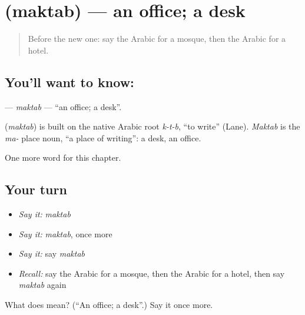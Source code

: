 \section[\texorpdfstring{\ar{مكتب} (maktab)}{مكتب (maktab)}]{ (maktab) — an office; a desk}

\label{lesson:AR-C92-maktab}



\begin{quote}
Before the new one: say the Arabic for a mosque, then the Arabic for a hotel.
\end{quote}

\subsection*{You'll want to know: }
\textbf{} — \emph{maktab} — \textquotedblleft{}an office; a desk\textquotedblright{}.

\begin{cousinweb}
\textbf{} (\emph{maktab}) is built on the native Arabic root \emph{k-t-b}, \textquotedblleft{}to write\textquotedblright{} (Lane). \emph{Maktab} is the \emph{ma-} place noun, \textquotedblleft{}a place of writing\textquotedblright{}: a desk, an office.
\end{cousinweb}

\begin{grammarlens}[title={What you've built}]
One more word for this chapter.
\end{grammarlens}

\subsection*{Your turn}
\begin{itemize}
\raggedright
  \item \emph{Say it:} \emph{maktab}
  \item \emph{Say it:} \emph{maktab}, once more
  \item \emph{Say it:} say \emph{maktab}
  \item \emph{Recall:} say the Arabic for a mosque, then the Arabic for a hotel, then say \emph{maktab} again
\end{itemize}

\begin{tcolorbox}[breakable,colback=teal!4,colframe=teal!35!black,title={Before you move on}]
What does  mean? (\textquotedblleft{}An office; a desk\textquotedblright{}.) Say it once more.
\end{tcolorbox}
